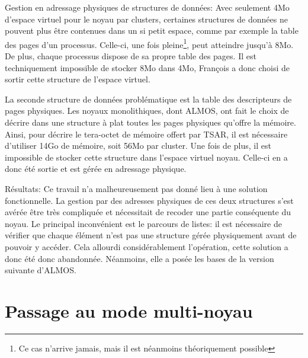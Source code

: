       \begin{paragraph}{Gestion en adressage physiques de structures de données:}
        Avec seulement 4Mo d'espace virtuel pour le noyau par clusters,
        certaines structures de données ne pouvent plus être contenues dans un
        si petit espace, comme par exemple la table des pages d'un
        processus. Celle-ci, une fois pleine\footnote{Ce cas n'arrive jamais,
          mais il est néanmoins théoriquement possible}, peut atteindre jusqu'à
        8Mo. De plus, chaque processus dispose de sa propre table des pages. Il
        est techniquement impossible de stocker 8Mo dans 4Mo, François a donc
        choisi de sortir cette structure de l'espace virtuel.

        La seconde structure de données problématique est la table des
        descripteurs de pages physiques. Les noyaux monolithiques, dont ALMOS,
        ont fait le choix de décrire dans une structure à plat toutes les pages
        physiques qu'offre la mémoire. Ainsi, pour décrire le tera-octet de
        mémoire offert par TSAR, il est nécessaire d'utiliser 14Go de mémoire,
        soit 56Mo par cluster. Une fois de plus, il est impossible de stocker
        cette structure dans l'espace virtuel noyau. Celle-ci en a donc été
        sortie et est gérée en adressage physique.
      \end{paragraph}

      \begin{paragraph}{Résultats:}
        Ce travail n'a malheureusement pas donné lieu à une solution
        fonctionnelle. La gestion par des adresses physiques de ces deux
        structures s'est avérée être très compliquée et nécessitait de recoder
        une partie conséquente du noyau. Le principal inconvénient est le
        parcours de listes: il est nécessaire de vérifier que chaque élément
        n'est pas une structure gérée physiquement avant de pouvoir y
        accéder. Cela allourdi considérablement l'opération, cette solution a
        donc été donc abandonnée. Néanmoins, elle a posée les bases de la
        version suivante d'ALMOS.
      \end{paragraph}

      
  \section{Passage au mode multi-noyau}
  \label{sec:multi-noyau}

